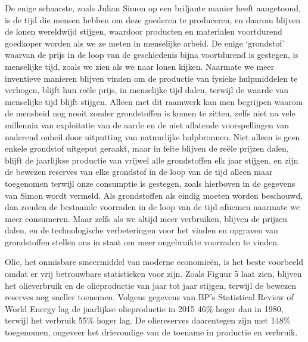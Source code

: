 De enige schaarste, zoals Julian Simon op een briljante manier heeft
aangetoond, is de tijd die mensen hebben om deze goederen te produceren,
en daarom blijven de lonen wereldwijd stijgen, waardoor producten en
materialen voortdurend goedkoper worden als we ze meten in menselijke
arbeid. De enige `grondstof' waarvan de prijs in de loop van de
geschiedenis bijna voortdurend is gestegen, is menselijke tijd, zoals we
zien als we naar lonen kijken. Naarmate we meer inventieve manieren
blijven vinden om de productie van fysieke hulpmiddelen te verhogen,
blijft hun reële prijs, in menselijke tijd dalen, terwijl de waarde van
menselijke tijd blijft stijgen. Alleen met dit raamwerk kan men
begrijpen waarom de mensheid nog nooit zonder grondstoffen is komen te
zitten, zelfs niet na vele millennia van exploitatie van de aarde en de
niet aflatende voorspellingen van naderend onheil door uitputting van
natuurlijke hulpbronnen. Niet alleen is geen enkele grondstof uitgeput
geraakt, maar in feite blijven de reële prijzen dalen, blijft de
jaarlijkse productie van vrijwel alle grondstoffen elk jaar stijgen, en
zijn de bewezen reserves van elke grondstof in de loop van de tijd
alleen maar toegenomen terwijl onze consumptie is gestegen, zoals
hierboven in de gegevens van Simon wordt vermeld. Als grondstoffen als
eindig moeten worden beschouwd, dan zouden de bestaande voorraden in de
loop van de tijd afnemen naarmate we meer consumeren. Maar zelfs als we
altijd meer verbruiken, blijven de prijzen dalen, en de technologische
verbeteringen voor het vinden en opgraven van grondstoffen stellen ons
in staat om meer ongebruikte voorraden te vinden.

Olie, het onmisbare smeermiddel van moderne economieën, is het beste
voorbeeld omdat er vrij betrouwbare statistieken voor zijn. Zoals Figuur
5 laat zien, blijven het olieverbruik en de olieproductie van jaar tot
jaar stijgen, terwijl de bewezen reserves nog sneller toenemen. Volgens
gegevens van BP's Statistical Review of World Energy lag de jaarlijkse
olieproductie in 2015 46\% hoger dan in 1980, terwijl het verbruik 55\%
hoger lag. De oliereserves daarentegen zijn met 148\% toegenomen,
ongeveer het drievoudige van de toename in productie en verbruik.

